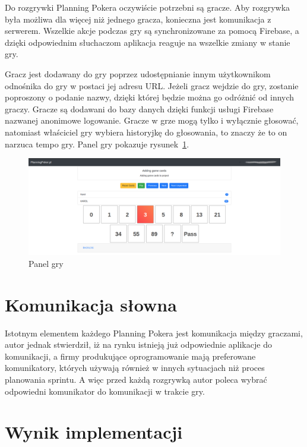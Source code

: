Do rozgrywki Planning Pokera oczywiście potrzebni są gracze.
Aby rozgrywka była możliwa dla więcej niż jednego gracza, konieczna jest komunikacja z serwerem.
Wszelkie akcje podczas gry są synchronizowane za pomocą Firebase,
a dzięki odpowiednim słuchaczom aplikacja reaguje na wszelkie zmiany w stanie gry.

Gracz jest dodawany do gry poprzez udostępnianie innym użytkownikom odnośnika do gry
w postaci jej adresu URL\@.
Jeżeli gracz wejdzie do gry, zostanie poproszony o podanie nazwy,
dzięki której będzie można go odróżnić od innych graczy.
Gracze są dodawani do bazy danych dzięki funkcji usługi Firebase nazwanej anonimowe logowanie.
Gracze w grze mogą tylko i wyłącznie głosować,
natomiast właściciel gry wybiera historyjkę do głosowania, to znaczy że to on narzuca tempo gry.
Panel gry pokazuje rysunek~\ref{rys:gra}.

\begin{figure}[h]
	\centering\includegraphics[width=\textwidth]{img/gra}
	\caption{Panel gry}\label{rys:gra}%
\end{figure}

\section{Komunikacja słowna}

Istotnym elementem każdego Planning Pokera jest komunikacja między graczami,
autor jednak stwierdził,
iż na rynku istnieją już odpowiednie aplikacje do komunikacji,
a firmy produkujące oprogramowanie mają preferowane komunikatory, których używają
również w innych sytuacjach niż proces planowania sprintu.
A więc przed każdą rozgrywką autor poleca wybrać odpowiedni komunikator do komunikacji w trakcie gry.


\section{Wynik implementacji}

